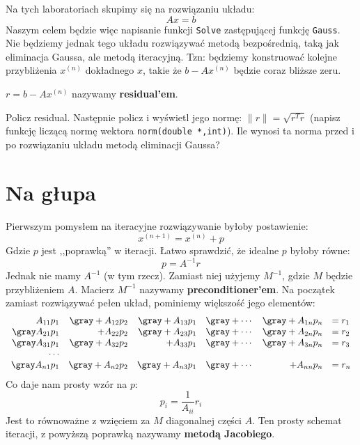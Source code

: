 \documentclass{instrukcja}
\begin{document}
\author{B. Górecki}
\materialtitle

Na tych laboratoriach skupimy się na rozwiązaniu układu:
\[Ax = b\]
Naszym celem będzie więc napisanie funkcji {\tt Solve} zastępującej funkcję {\tt Gauss}. Nie będziemy jednak tego układu rozwiązywać metodą bezpośrednią, taką jak eliminacja Gaussa, ale metodą iteracyjną. Tzn: będziemy konstruować kolejne przybliżenia $x^{(n)}$ dokładnego $x$, takie że $b-Ax^{(n)}$ będzie coraz bliższe zeru.

 $r = b-Ax^{(n)}$ nazywamy {\bf residual'em}.

\begin{zad}Policz residual. Następnie policz i wyświetl jego normę: $\|r\|=\sqrt{r^Tr}$ (napisz funkcję liczącą normę wektora {\tt norm(double *,int)}). Ile wynosi ta norma przed i po rozwiązaniu układu metodą eliminacji Gaussa?\end{zad}

\section{Na głupa}

Pierwszym pomysłem na iteracyjne rozwiązywanie byłoby postawienie:
\[x^{(n+1)} = x^{(n)} + p\]
Gdzie $p$ jest ,,poprawką'' w iteracji. Łatwo sprawdzić, że idealne $p$ byłoby równe:
\[p = A^{-1}r\]
Jednak nie mamy $A^{-1}$ (w tym rzecz). Zamiast niej użyjemy $M^{-1}$, gdzie $M$ będzie przybliżeniem $A$. Macierz $M^{-1}$ nazywamy {\bf preconditioner'em}. Na początek zamiast rozwiązywać pełen układ, pominiemy większość jego elementów:
\[\begin{array}{rrrrrl}
A_{11}p_1 & \gray +A_{12}p_2&\gray +A_{13}p_1&\gray +\cdots &\gray +A_{1n}p_n&= r_1\\
\gray A_{21}p_1&+ A_{22}p_2 &\gray +A_{23}p_1&\gray +\cdots &\gray +A_{2n}p_n&= r_2\\
\gray A_{31}p_1&\gray +A_{32}p_2&+A_{33}p_1&\gray +\cdots &\gray +A_{3n}p_n&= r_3\\
\cdots\\
\gray A_{n1}p_1&\gray +A_{n2}p_2&\gray +A_{n3}p_1&\gray +\cdots &+A_{nn}p_n&= r_n\\
\end{array}\]
Co daje nam prosty wzór na $p$:
\[p_i = \frac{1}{A_{ii}}{r_i}\]
Jest to równoważne z wzięciem za $M$ diagonalnej części $A$. Ten prosty schemat iteracji, z powyższą poprawką nazywamy {\bf metodą Jacobiego}.
\end{document}
